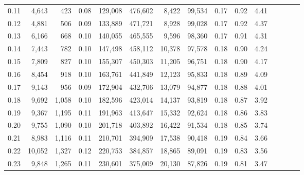 \begin{tabular}{rrrcrrrrrrrrrrr}
0.11 &   4,643 &    423 &                                       0.08 &  129,008 &  476,602 &    8,422 &   99,534 &  0.17 &  0.92 &                         4.41 \\
0.12 &   4,881 &    506 &                                       0.09 &  133,889 &  471,721 &    8,928 &   99,028 &  0.17 &  0.92 &                         4.37 \\
0.13 &   6,166 &    668 &                                       0.10 &  140,055 &  465,555 &    9,596 &   98,360 &  0.17 &  0.91 &                         4.31 \\
0.14 &   7,443 &    782 &                                       0.10 &  147,498 &  458,112 &   10,378 &   97,578 &  0.18 &  0.90 &                         4.24 \\
0.15 &   7,809 &    827 &                                       0.10 &  155,307 &  450,303 &   11,205 &   96,751 &  0.18 &  0.90 &                         4.17 \\
0.16 &   8,454 &    918 &                                       0.10 &  163,761 &  441,849 &   12,123 &   95,833 &  0.18 &  0.89 &                         4.09 \\
0.17 &   9,143 &    956 &                                       0.09 &  172,904 &  432,706 &   13,079 &   94,877 &  0.18 &  0.88 &                         4.01 \\
0.18 &   9,692 &  1,058 &                                       0.10 &  182,596 &  423,014 &   14,137 &   93,819 &  0.18 &  0.87 &                         3.92 \\
0.19 &   9,367 &  1,195 &                                       0.11 &  191,963 &  413,647 &   15,332 &   92,624 &  0.18 &  0.86 &                         3.83 \\
0.20 &   9,755 &  1,090 &                                       0.10 &  201,718 &  403,892 &   16,422 &   91,534 &  0.18 &  0.85 &                         3.74 \\
0.21 &   8,983 &  1,116 &                                       0.11 &  210,701 &  394,909 &   17,538 &   90,418 &  0.19 &  0.84 &                         3.66 \\
0.22 &  10,052 &  1,327 &                                       0.12 &  220,753 &  384,857 &   18,865 &   89,091 &  0.19 &  0.83 &                         3.56 \\
0.23 &   9,848 &  1,265 &                                       0.11 &  230,601 &  375,009 &   20,130 &   87,826 &  0.19 &  0.81 &                         3.47 \\

\end{tabular}
